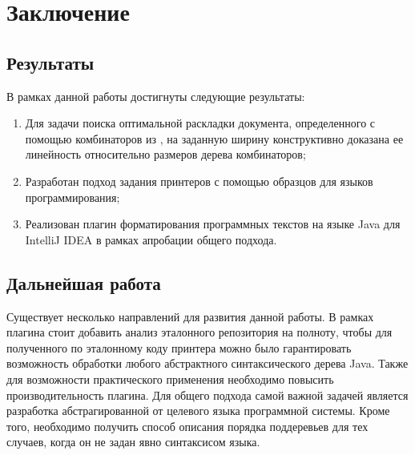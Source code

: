 \section*{Заключение}

\subsection*{Результаты}

В рамках данной работы достигнуты следующие результаты:
\begin{enumerate}
\item Для задачи поиска оптимальной раскладки документа,
определенного с помощью комбинаторов из \cite{swierstra}, на заданную ширину
конструктивно доказана ее линейность относительно размеров дерева комбинаторов;
\item Разработан подход задания принтеров с помощью образцов для языков программирования;
\item Реализован плагин форматирования программных текстов на языке Java для IntelliJ IDEA
в рамках апробации общего подхода.
\end{enumerate}


\subsection*{Дальнейшая работа}

Существует несколько направлений для развития данной работы.
В рамках плагина стоит добавить
анализ эталонного репозитория на полноту, чтобы для полученного по
эталонному коду принтера можно было гарантировать возможность
обработки любого абстрактного синтаксического дерева Java.
Также для возможности практического применения необходимо повысить
производительность плагина.
Для общего подхода самой важной задачей является разработка
абстрагированной от целевого языка программной системы. Кроме того,
необходимо получить способ описания порядка поддеревьев для тех
случаев, когда он не задан явно синтаксисом языка.
